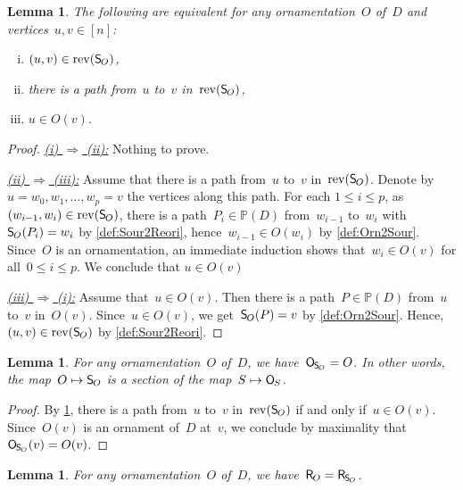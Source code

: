 \documentclass{amsart}
\newtheorem{lemma}[theorem]{Lemma}
\theoremstyle{definition}
\newcommand{\mymap}[2]{\mathsf{#1}_{\hspace{-.7pt}#2}}
\newcommand{\orn}[1]{\mymap{O}{#1}}  %
\newcommand{\reori}[1]{\mymap{R}{#1}}  %
\DeclareMathOperator{\rev}{rev} %
\newcommand{\sour}[1]{\mymap{S}{#1}}  %
\newcommand{\PP}{\mathbb P} %
\begin{document}
\begin{lemma}
\label{lem:Orn2Sour2}
The following are equivalent for any ornamentation~$O$ of~$D$ and vertices~$u,v \in [n]$:
\begin{enumerate}[(i)]
\item $(u,v) \in \rev(\sour{O})$,
\item there is a path from~$u$ to~$v$ in~$\rev(\sour{O})$,
\item $u \in O(v)$.
\end{enumerate}
\end{lemma}

\begin{proof}
\uline{\textsl{(i) $\Rightarrow$ (ii):}}
Nothing to prove.

\medskip\noindent
\uline{\textsl{(ii) $\Rightarrow$ (iii):}}
Assume that there is a path from~$u$ to~$v$ in~$\rev(\sour{O})$.
Denote by~${u = w_0, w_1, \dots, w_p = v}$ the vertices along this path.
For each $1 \le i \le p$, as~$(w_{i-1}, w_i) \in \rev(\sour{O})$, there is a path~$P_i \in \PP(D)$ from~$w_{i-1}$ to~$w_i$ with~$\sour{O}(P_i) = w_i$ by \cref{def:Sour2Reori}, hence~$w_{i-1} \in O(w_i)$ by \cref{def:Orn2Sour}.
Since~$O$ is an ornamentation, an immediate induction shows that~$w_i \in O(v)$ for all~$0 \le i \le p$.
We conclude that $u \in O(v)$

\medskip\noindent
\uline{\textsl{(iii) $\Rightarrow$ (i):}}
Assume that~$u \in O(v)$.
Then there is a path~$P \in \PP(D)$ from~$u$ to~$v$ in~$O(v)$.
Since~${u \in O(v)}$, we get~$\sour{O}(P) = v$ by \cref{def:Orn2Sour}.
Hence,~$(u,v) \in \rev(\sour{O})$ by \cref{def:Sour2Reori}.
\end{proof}

\begin{lemma}
\label{lem:Orn2Sour3}
For any ornamentation~$O$ of~$D$, we have~$\orn{\sour{O}} = O$. In other words, the map~${O \mapsto \sour{O}}$ is a section of the map~$S \mapsto \orn{S}$.
\end{lemma}

\begin{proof}
By \cref{lem:Orn2Sour2}, there is a path from~$u$ to~$v$ in~$\rev(\sour{O})$ if and only if~$u \in O(v)$.
Since~$O(v)$ is an ornament of~$D$ at~$v$, we conclude by maximality that~$\orn{\sour{O}}(v) = O(v)$.
\end{proof}

\begin{lemma}
\label{lem:Orn2Sour4}
For any ornamentation~$O$ of~$D$, we have~$\reori{O} = \reori{\sour{O}}$.
\end{lemma}
\end{document}
